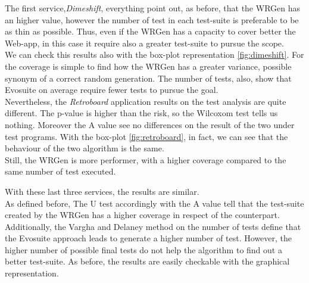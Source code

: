 The first service,\emph{Dimeshift}, everything point out, as before, that the WRGen has an higher value, however the number of test in each test-suite is preferable to be as thin as possible.
Thus, even if the WRGen has a capacity to cover better the Web-app, in this case it require also a greater test-suite to pursue the scope.\\
We can check this results also with the box-plot representation \ref{fig:dimeshift}.
For the coverage is simple to find how the WRGen has a greater variance, possible synonym of a correct random generation.
The number of tests, also, show that Evosuite on average require fewer tests to pursue the goal.\\
Nevertheless, the \emph{Retroboard} application results on the test analysis are quite different.
The p-value is higher than the risk, so the Wilcoxom test tells us nothing.
Moreover the A value see no differences on the result of the two under test programs.
With the box-plot \ref{fig:retroboard}, in fact, we can see that the behaviour of the two algorithm is the same.\\
Still, the WRGen is more performer, with a higher coverage compared to the same number of test executed.
\begin{figure}[H]
	\centering
	
	
\end{figure}
\begin{figure}[H]
	\centering
	
\end{figure}
With these last three services, the results are similar.\\
As defined before, The U test accordingly with the A value tell that the test-suite created by the WRGen has a higher coverage in respect of the counterpart.\\
Additionally, the Vargha and Delaney method on the number of tests define that the Evosuite approach leads to generate a higher number of test.
However, the higher number of possible final tests do not help the algorithm to find out a better test-suite.
As before, the results are easily checkable with the graphical representation.
\newpage
